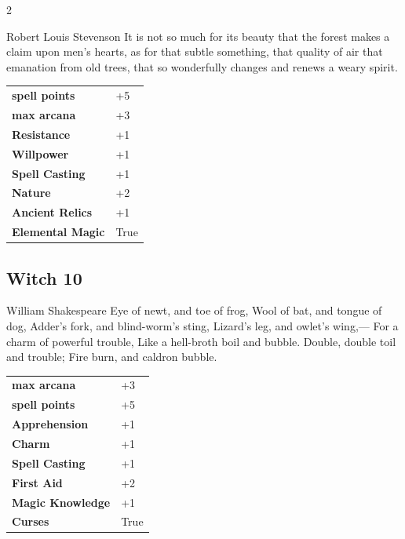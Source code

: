 \begin{multicols}{2}
\begin{tcolorbox}
\begin{pquote}{Robert Louis Stevenson}
It is not so much for its beauty that the forest makes a claim upon men’s hearts, as for that subtle something, that quality of air that emanation from old trees, that so wonderfully changes and renews a weary spirit.
\end{pquote}

\vspace{3mm}

\begin{tabular}{@{}ll@{}}
    \textbf{spell points} & +5\\
    \textbf{max arcana} & +3\\
    \textbf{Resistance} & +1\\
    \textbf{Willpower} & +1\\
    \textbf{Spell Casting} & +1\\
    \textbf{Nature} & +2\\
    \textbf{Ancient Relics} & +1\\
    \textbf{Elemental Magic} & True\\
\end{tabular}


\end{tcolorbox}

\begin{tcolorbox}
    \subsection*{Witch \hfill \small{10 }}
    \tcblower


\begin{pquote}{William Shakespeare}
Eye of newt, and toe of frog,
Wool of bat, and tongue of dog,
Adder's fork, and blind-worm's sting,
Lizard's leg, and owlet's wing,—
For a charm of powerful trouble,
Like a hell-broth boil and bubble.
Double, double toil and trouble;
Fire burn, and caldron bubble.
\end{pquote}

\vspace{3mm}

\begin{tabular}{@{}ll@{}}
    \textbf{max arcana} & +3\\
    \textbf{spell points} & +5\\
    \textbf{Apprehension} & +1\\
    \textbf{Charm} & +1\\
    \textbf{Spell Casting} & +1\\
    \textbf{First Aid} & +2\\
    \textbf{Magic Knowledge} & +1\\
    \textbf{Curses} & True\\
\end{tabular}


\end{tcolorbox}
\end{multicols}
